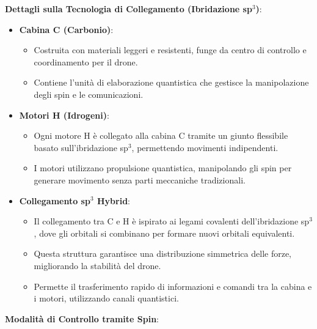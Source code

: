 \begin{tcolorbox}[fontupper=\tiny, fontlower=\Large,colback=white,colframe=black,title=\textbf{CH$_4$ Drones} (\emph{Droni Molecolari di Metano} pt.2)]
\begin{multicols}{2}
\textbf{Dettagli sulla Tecnologia di Collegamento (Ibridazione sp$^3$)}:

\begin{itemize}
    \item \textbf{Cabina C (Carbonio)}:
    \begin{itemize}
        \item Costruita con materiali leggeri e resistenti, funge da centro di controllo e coordinamento per il drone.
        \item Contiene l'unità di elaborazione quantistica che gestisce la manipolazione degli spin e le comunicazioni.
    \end{itemize}
    \item \textbf{Motori H (Idrogeni)}:
    \begin{itemize}
        \item Ogni motore H è collegato alla cabina C tramite un giunto flessibile basato sull'ibridazione sp$^3$, permettendo movimenti indipendenti.
        \item I motori utilizzano propulsione quantistica, manipolando gli spin per generare movimento senza parti meccaniche tradizionali.
    \end{itemize}
    \item \textbf{Collegamento sp$^3$ Hybrid}:
    \begin{itemize}
        \item Il collegamento tra C e H è ispirato ai legami covalenti dell'ibridazione sp$^3$, dove gli orbitali si combinano per formare nuovi orbitali equivalenti.
        \item Questa struttura garantisce una distribuzione simmetrica delle forze, migliorando la stabilità del drone.
        \item Permette il trasferimento rapido di informazioni e comandi tra la cabina e i motori, utilizzando canali quantistici.
    \end{itemize}
\end{itemize}

\textbf{Modalità di Controllo tramite Spin}:


\end{multicols}
\end{tcolorbox}
